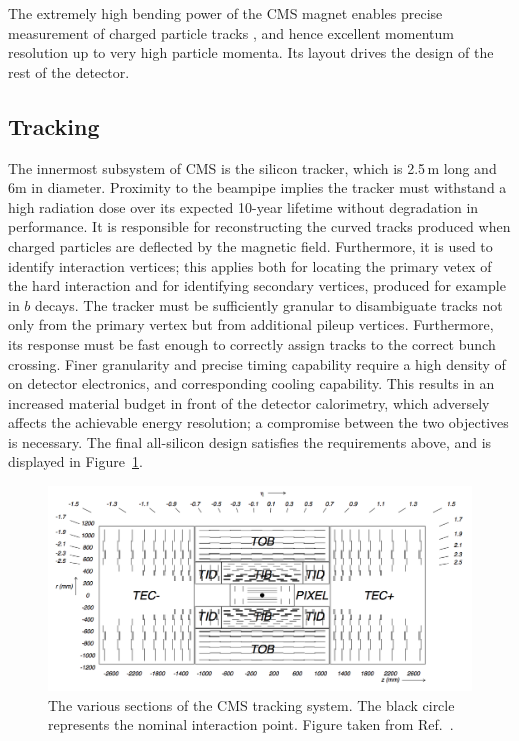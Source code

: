The extremely high bending power of the CMS magnet enables precise measurement of charged particle tracks , 
and hence excellent momentum resolution up to very high particle momenta.
Its layout drives the design of the rest of the detector.

\subsection{Tracking}

The innermost subsystem of CMS is the silicon tracker, which is 2.5\,m long and 6m in diameter. 
Proximity to the beampipe implies the tracker must withstand a high radiation dose over its expected 10-year lifetime without degradation in performance.
It is responsible for reconstructing the curved tracks produced when charged particles are deflected by the magnetic field. %
Furthermore, it is used to identify interaction vertices; 
this applies both for locating the primary vetex of the hard interaction and for identifying secondary vertices, produced for example in $b$ decays.
The tracker must be sufficiently granular to disambiguate tracks not only from the primary vertex but from additional pileup vertices.
Furthermore, its response must be fast enough to correctly assign tracks to the correct bunch crossing.
Finer granularity and precise timing capability require a high density of on detector electronics, and corresponding cooling capability.
This results in an increased material budget in front of the detector calorimetry, which adversely affects the achievable energy resolution; 
a compromise between the two objectives is necessary.
The final all-silicon design satisfies the requirements above, and is displayed in Figure~\ref{fig:detector_tracker}.

\begin{figure}[h!]
  \centering
  \includegraphics[width=\textwidth]{Figures/Detector/TrackerUgly.png}
  \caption[The CMS tracker.]
  {The various sections of the CMS tracking system.
  The black circle represents the nominal interaction point.
  Figure taken from Ref.~\cite{CMSdetector}.}
  \label{fig:detector_tracker}
\end{figure}

